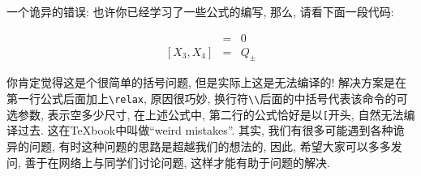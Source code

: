 \Q 一个诡异的错误:
\A 也许你已经学习了一些公式的编写, 那么, 请看下面一段代码:
\begin{code}
\begin{eqnarray}
  [X_1, X_2] &=& 0\\
  [X_3, X_4] &=& Q_{\pm}
\end{eqnarray}
\end{code}
你肯定觉得这是个很简单的括号问题, 但是实际上这是无法编译的! 解决方案是在第一行公式后面加上\verb|\relax|, 原因很巧妙, 换行符\verb|\\|后面的中括号代表该命令的可选参数, 表示空多少尺寸, 在上述公式中, 第二行的公式恰好是以\verb|[|开头, 自然无法编译过去. 这在TeXbook中叫做``weird mistakes''. 其实, 我们有很多可能遇到各种诡异的问题, 有时这种问题的思路是超越我们的想法的, 因此, 希望大家可以多多发问, 善于在网络上与同学们讨论问题, 这样才能有助于问题的解决.


